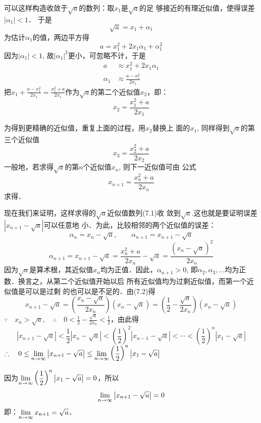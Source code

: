 \begin{solution}
可以这样构造收敛于$\sqrt{a}$的数列：取$x_1$是$\sqrt{a}$的足
够接近的有理近似值，使得误差$|\alpha_1|<1$．
于是
\[\sqrt{a}=x_1+\alpha_1\]
为估计$\alpha_1$的值，两边平方得
\[a=x^2_1+2x_1\alpha_1+\alpha_1^2\]
因为$|\alpha_1|<1$, 故$|\alpha_1|^2$更小，可忽略不计，于是
\[\begin{split}
    a&\approx x^2_1+2x_1\alpha_1\\
    \alpha_1&\approx \frac{a-x^2_1}{2x_1}
\end{split}\]
把$x_1+\frac{a-x^2_1}{2x_1}=\frac{x^2_1+a}{2x_1}$作为$\sqrt{a}$的第二个近似值$x_2$，即：
\[x_2=\frac{x^2_1+a}{2x_1}\]

为得到更精确的近似值，重复上面的过程，用$x_2$替换上
面的$x_1$, 同样得到$\sqrt{a}$的第三个近似值
\[x_3=\frac{x^2_2+a}{2x_2}\]
一般地，若求得$\sqrt{a}$的第$n$个近似值$x_n$, 则下一近似值可由
公式
\begin{equation}
    x_{n+1}=\frac{x^2_n+a}{2x_n}
\end{equation}
求得．

现在我们来证明，这样求得的$\sqrt{a}$近似值数列(7.1)收
敛到$\sqrt{a}$.这也就是要证明误差$|x_{n+1}-\sqrt{a}|$可以任意地
小．为此，比较相邻的两个近似值的误差：
\[\alpha_n=x_n-\sqrt{a},\qquad \alpha_{n+1}=x_{n+1}-\sqrt{a}\]
\begin{equation}
    \alpha_{n+1}=x_{n+1}-\sqrt{a}=\frac{x^2_n+a}{2x_n}-\sqrt{a}=\frac{\left(x_n-\sqrt{a}\right)^2}{2x_n}
\end{equation}
因为$\sqrt{a}$是算术根，其近似值$x_n$均为正值．因此，$\alpha_{n+1}>0$, 即$\alpha_2,\alpha_3,\ldots$均为正数．换言之，从第二个近似值开始以后
所有近似值均为过剩近似值，而第一个近似值是可以是过剩
的也可以是不足的．由(7.2)得
\[x_{n+1}-\sqrt{a}=\left(\frac{x_n-\sqrt{a}}{2x_n}\right)\left(x_n-\sqrt{a}\right)=\left(\frac{1}{2}-\frac{\sqrt{a}}{2x_n}\right)\left(x_n-\sqrt{a}\right)\]
$\because\quad x_n>\sqrt{a},\quad \therefore\quad 0<\frac{1}{2}-\frac{\sqrt{a}}{2x_n}<\frac{1}{2}$，由此得
\[\left|x_{n+1}-\sqrt{a}\right|<\frac{1}{2}\left|x_n-\sqrt{a}\right|<\left(\frac{1}{2}\right)^2\left|x_{n-1}-\sqrt{a}\right|<\cdots <\left(\frac{1}{2}\right)^n\left|x_1-\sqrt{a}\right|\]
$\therefore\quad 0\le \displaystyle\lim_{n\to\infty} \left|x_{n+1}-\sqrt{a}\right|\le \displaystyle\lim_{n\to\infty}\left(\dfrac{1}{2}\right)^n\left|x_1-\sqrt{a}\right|$

因为$\displaystyle\lim_{n\to\infty}\left(\dfrac{1}{2}\right)^n\left|x_1-\sqrt{a}\right|=0$，所以$$\displaystyle\lim_{n\to\infty}\left|x_{n+1}-\sqrt{a}\right|=0$$
即：$\displaystyle\lim_{n\to\infty} x_{n+1}=\sqrt{a}$．
\end{solution}

